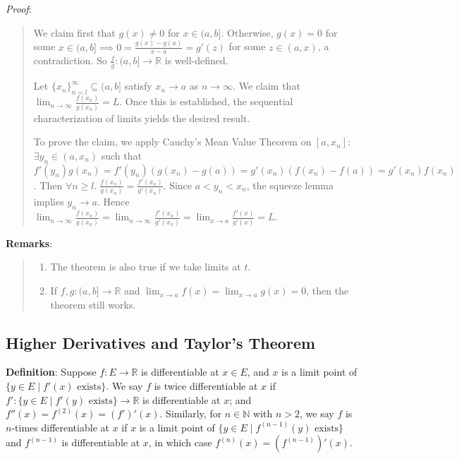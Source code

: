 \documentclass[11pt]{article}
\begin{document}
\emph{Proof}:
\begin{quote}\vspace{-0.3cm}
We claim first that $g(x) \neq 0$ for $x \in (a,b]$. Otherwise, $g(x) = 0$ for some $x \in (a,b] \implies 0 = \frac{g(x) - g(a)}{x-a} = g'(z)$ for some $z \in (a,x)$, a contradiction. So $\frac{f}{g} : (a, b] \to \mathbb{R}$ is well-defined.

Let $\{x_n\}_{n=l}^\infty \subseteq (a,b]$ satisfy $x_n \to a$ as $n \to \infty$. We claim that $\lim_{n \to \infty} \frac{f(x_n)}{g(x_n)} = L$. Once this is established, the sequential characterization of limits yields the desired result.

To prove the claim, we apply Cauchy's Mean Value Theorem on $[a, x_n]$: $\exists y_n \in (a, x_n)$ such that $f'(y_n) g(x_n) = f'(y_n)(g(x_n) - g(a)) = g'(x_n) (f(x_n) - f(a)) = g'(x_n) f(x_n)$. Then $\forall n \geq l.\; \frac{f(x_n)}{g(x_n)} = \frac{f'(x_n)}{g'(x_n)}$. Since $a < y_n < x_n$, the squeeze lemma implies $y_n \to a$. Hence $\lim_{n \to \infty} \frac{f(x_n)}{g(x_n)} = \lim_{n \to \infty} \frac{f'(x_n)}{g'(x_n)} = \lim_{x \to a} \frac{f'(x)}{g'(x)} = L$.
\end{quote}

\textbf{Remarks}:
\begin{quote}\vspace{-0.3cm}
	\begin{enumerate}
	\item The theorem is also true if we take limits at $t$.
	\item If $f,g : (a,b] \to \mathbb{R}$ and $\lim_{x \to a} f(x) = \lim_{x \to a} g(x) = 0$, then the theorem still works.
	\end{enumerate}
\end{quote}

\subsection{Higher Derivatives and Taylor's Theorem}

\textbf{Definition}: Suppose $f : E \to \mathbb{R}$ is differentiable at $x \in E$, and $x$ is a limit point of $\{y \in E \mid f'(x) \text{ exists}\}$. We say $f$ is twice differentiable at $x$ if $f' : \{y \in E \mid f'(y) \text{ exists}\} \to \mathbb{R}$ is differentiable at $x$; and $f''(x) = f^{(2)}(x) = (f')'(x)$. Similarly, for $n \in \mathbb{N}$ with $n > 2$, we say $f$ is $n$-times differentiable at $x$ if $x$ is a limit point of $\{y \in E \mid f^{(n-1)}(y) \text{ exists}\}$ and $f^{(n-1)}$ is differentiable at $x$, in which case $f^{(n)}(x) = (f^{(n-1)})'(x)$.
\end{document}
